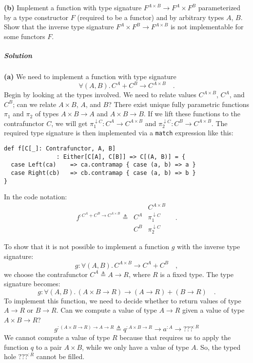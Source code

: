 \textbf{(b)} Implement a function with type signature $F^{A\times B}\rightarrow F^{A}\times F^{B}$
parameterized by a type constructor $F$ (required to be a functor)
and by arbitrary types $A$, $B$. Show that the inverse type signature
$F^{A}\times F^{B}\rightarrow F^{A\times B}$ is not implementable
for some functors $F$.

\subparagraph{Solution}

\textbf{(a)} We need to implement a function with type signature
\[
\forall(A,B).\,C^{A}+C^{B}\rightarrow C^{A\times B}\quad.
\]
Begin by looking at the types involved. We need to relate values $C^{A\times B}$,
$C^{A}$, and $C^{B}$; can we relate $A\times B$, $A$, and $B$?
There exist unique fully parametric functions $\pi_{1}$ and $\pi_{2}$
of types $A\times B\rightarrow A$ and $A\times B\rightarrow B$.
If we lift these functions to the contrafunctor $C$, we will get
$\pi_{1}^{\downarrow C}:C^{A}\rightarrow C^{A\times B}$ and $\pi_{2}^{\downarrow C}:C^{B}\rightarrow C^{A\times B}$.
The required type signature is then implemented via a \lstinline!match!
expression like this:
\begin{lstlisting}
def f[C[_]: Contrafunctor, A, B]
               : Either[C[A], C[B]] => C[(A, B)] = {
  case Left(ca)    => ca.contramap { case (a, b) => a }
  case Right(cb)   => cb.contramap { case (a, b) => b }
}
\end{lstlisting}
In the code notation:
\[
f^{:C^{A}+C^{B}\rightarrow C^{A\times B}}\triangleq\,\begin{array}{|c||c|}
 & C^{A\times B}\\
\hline C^{A} & \pi_{1}^{\downarrow C}\\
C^{B} & \pi_{2}^{\downarrow C}
\end{array}\quad.
\]

To show that it is not possible to implement a function $g$ with
the inverse type signature:
\[
g:\forall(A,B).\,C^{A\times B}\rightarrow C^{A}+C^{B}\quad,
\]
we choose the contrafunctor $C^{A}\triangleq A\rightarrow R$, where
$R$ is a fixed type. The type signature becomes:
\[
g:\forall(A,B).\,(A\times B\rightarrow R)\rightarrow(A\rightarrow R)+(B\rightarrow R)\quad.
\]
To implement this function, we need to decide whether to return values
of type $A\rightarrow R$ or $B\rightarrow R$. Can we compute a value
of type $A\rightarrow R$ given a value of type $A\times B\rightarrow R$?
\[
g^{:(A\times B\rightarrow R)\rightarrow A\rightarrow R}\triangleq q^{:A\times B\rightarrow R}\rightarrow a^{:A}\rightarrow\text{???}^{:R}
\]
We cannot compute a value of type $R$ because that requires us to
apply the function $q$ to a pair $A\times B$, while we only have
a value of type $A$. So, the typed hole $\text{???}^{:R}$ cannot
be filled. 

